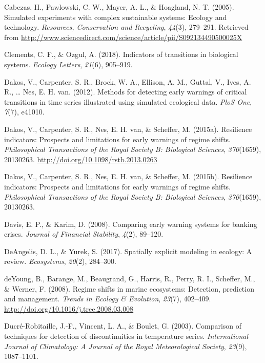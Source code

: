 \documentclass[12pt,twoside,openany]{reedthesis}
\begin{document}
\hypertarget{ref-cabezas_simulated_2005}{}
Cabezas, H., Pawlowski, C. W., Mayer, A. L., \& Hoagland, N. T. (2005).
Simulated experiments with complex sustainable systems: Ecology and
technology. \emph{Resources, Conservation and Recycling}, \emph{44}(3),
279--291. Retrieved from
\url{http://www.sciencedirect.com/science/article/pii/S092134490500025X}

\hypertarget{ref-clements2018indicators}{}
Clements, C. F., \& Ozgul, A. (2018). Indicators of transitions in
biological systems. \emph{Ecology Letters}, \emph{21}(6), 905--919.

\hypertarget{ref-dakos_methods_2012}{}
Dakos, V., Carpenter, S. R., Brock, W. A., Ellison, A. M., Guttal, V.,
Ives, A. R., \ldots{} Nes, E. H. van. (2012). Methods for detecting
early warnings of critical transitions in time series illustrated using
simulated ecological data. \emph{PloS One}, \emph{7}(7), e41010.

\hypertarget{ref-dakos_resilience_2015}{}
Dakos, V., Carpenter, S. R., Nes, E. H. van, \& Scheffer, M. (2015a).
Resilience indicators: Prospects and limitations for early warnings of
regime shifts. \emph{Philosophical Transactions of the Royal Society B:
Biological Sciences}, \emph{370}(1659), 20130263.
\url{http://doi.org/10.1098/rstb.2013.0263}

\hypertarget{ref-dakos2015resilience}{}
Dakos, V., Carpenter, S. R., Nes, E. H. van, \& Scheffer, M. (2015b).
Resilience indicators: Prospects and limitations for early warnings of
regime shifts. \emph{Philosophical Transactions of the Royal Society B:
Biological Sciences}, \emph{370}(1659), 20130263.

\hypertarget{ref-davis_comparing_2008}{}
Davis, E. P., \& Karim, D. (2008). Comparing early warning systems for
banking crises. \emph{Journal of Financial Stability}, \emph{4}(2),
89--120.

\hypertarget{ref-deangelis2017spatially}{}
DeAngelis, D. L., \& Yurek, S. (2017). Spatially explicit modeling in
ecology: A review. \emph{Ecosystems}, \emph{20}(2), 284--300.

\hypertarget{ref-deyoung_regime_2008}{}
deYoung, B., Barange, M., Beaugrand, G., Harris, R., Perry, R. I.,
Scheffer, M., \& Werner, F. (2008). Regime shifts in marine ecosystems:
Detection, prediction and management. \emph{Trends in Ecology \&
Evolution}, \emph{23}(7), 402--409.
\url{http://doi.org/10.1016/j.tree.2008.03.008}

\hypertarget{ref-ducre2003comparison}{}
Ducré-Robitaille, J.-F., Vincent, L. A., \& Boulet, G. (2003).
Comparison of techniques for detection of discontinuities in temperature
series. \emph{International Journal of Climatology: A Journal of the
Royal Meteorological Society}, \emph{23}(9), 1087--1101.
\end{document}
